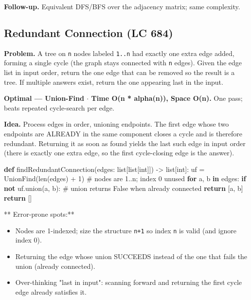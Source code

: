 \documentclass[11pt]{article}
\providecommand{\tightlist}{\setlength{\itemsep}{1pt}\setlength{\parskip}{0pt}}
\newenvironment{Shaded}{\begin{snugshade}}{\end{snugshade}}
\newcommand{\BuiltInTok}[1]{\textcolor[rgb]{0.50,0.55,0.55}{#1}}
\newcommand{\CommentTok}[1]{\textcolor[rgb]{0.48,0.49,0.49}{#1}}
\newcommand{\ControlFlowTok}[1]{\textcolor[rgb]{0.99,0.74,0.29}{\textbf{#1}}}
\newcommand{\DecValTok}[1]{\textcolor[rgb]{0.96,0.45,0.00}{#1}}
\newcommand{\KeywordTok}[1]{\textcolor[rgb]{0.81,0.81,0.76}{\textbf{#1}}}
\newcommand{\NormalTok}[1]{\textcolor[rgb]{0.81,0.81,0.76}{#1}}
\newcommand{\OperatorTok}[1]{\textcolor[rgb]{0.81,0.81,0.76}{#1}}
\begin{document}
\textbf{Follow-up.} Equivalent DFS/BFS over the adjacency matrix; same complexity.

\subsection{Redundant Connection (LC 684)}\label{redundant-connection-lc-684}

\textbf{Problem.} A tree on \texttt{n} nodes labeled \texttt{1..n} had exactly one extra edge added, forming a single cycle (the graph stays connected with \texttt{n} edges). Given the edge list in input order, return the one edge that can be removed so the result is a tree. If multiple answers exist, return the one appearing last in the input.

\textbf{Optimal --- Union-Find \(\cdot\) Time O(n * alpha(n)), Space O(n).} One pass; beats repeated cycle-search per edge.

\textbf{Idea.} Process edges in order, unioning endpoints. The first edge whose two endpoints are ALREADY in the same component closes a cycle and is therefore redundant. Returning it as soon as found yields the last such edge in input order (there is exactly one extra edge, so the first cycle-closing edge is the answer).


\begin{Shaded}
\begin{Highlighting}[]
\KeywordTok{def}\NormalTok{ findRedundantConnection(edges: }\BuiltInTok{list}\NormalTok{[}\BuiltInTok{list}\NormalTok{[}\BuiltInTok{int}\NormalTok{]]) }\OperatorTok{{-}\textgreater{}} \BuiltInTok{list}\NormalTok{[}\BuiltInTok{int}\NormalTok{]:}
\NormalTok{    uf }\OperatorTok{=}\NormalTok{ UnionFind(}\BuiltInTok{len}\NormalTok{(edges) }\OperatorTok{+} \DecValTok{1}\NormalTok{)   }\CommentTok{\# nodes are 1..n; index 0 unused}
    \ControlFlowTok{for}\NormalTok{ a, b }\KeywordTok{in}\NormalTok{ edges:}
        \ControlFlowTok{if} \KeywordTok{not}\NormalTok{ uf.union(a, b):       }\CommentTok{\# union returns False when already connected}
            \ControlFlowTok{return}\NormalTok{ [a, b]}
    \ControlFlowTok{return}\NormalTok{ []}
\end{Highlighting}
\end{Shaded}

** Error-prone spots:**

\begin{itemize}
\tightlist
\item
  Nodes are 1-indexed; size the structure \texttt{n+1} so index \texttt{n} is valid (and ignore index 0).
\item
  Returning the edge whose union SUCCEEDS instead of the one that fails the union (already connected).
\item
  Over-thinking "last in input": scanning forward and returning the first cycle edge already satisfies it.
\end{itemize}
\end{document}
